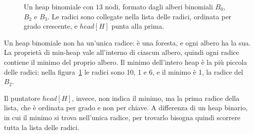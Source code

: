 \begin{figure}[htbp]
\centering
{}
\caption{Un heap binomiale con $13$ nodi, formato dagli alberi binomiali $B_0$, $B_2$ e $B_3$. Le radici sono collegate nella lista delle radici, ordinata per grado crescente, e $\mathit{head}[H]$ punta alla prima.}
\label{fig:hb-esempio}
\end{figure}

\begin{osservazione}
Un heap binomiale non ha un'unica radice: è una foresta, e ogni albero ha la sua. La proprietà di min-heap vale all'interno di ciascun albero, quindi ogni radice contiene il minimo del proprio albero. Il minimo dell'intero heap è la più piccola delle radici: nella figura~\ref{fig:hb-esempio} le radici sono 10, 1 e 6, e il minimo è 1, la radice del $B_2$.

Il puntatore $\mathit{head}[H]$, invece, non indica il minimo, ma la prima radice della lista, che è ordinata per grado e non per chiave. A differenza di un heap binario, in cui il minimo si trova nell'unica radice, per trovarlo bisogna quindi scorrere tutta la lista delle radici.
\end{osservazione}

